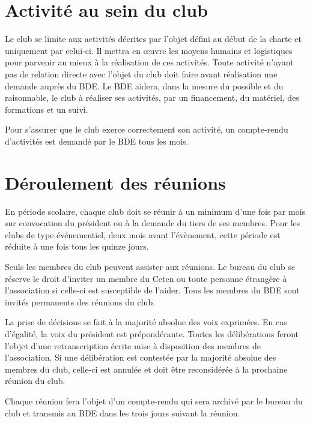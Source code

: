 \documentclass{article} %
\begin{document}
\begin{multicols}{2}
{		}

		\section{Activité au sein du club}
		
		{\small
		
			Le club se limite aux activités décrites par l’objet défini au début
			de la charte et uniquement par celui-ci. Il mettra en œuvre les
			moyens humains et logistiques pour parvenir au mieux à la
			réalisation de ces activités. Toute activité n’ayant pas de relation
			directe avec l’objet du club doit faire avant réalisation une
			demande auprès du BDE\@. Le BDE aidera, dans la mesure du possible et
			du raisonnable, le club à réaliser ses activités, par un 
			financement, du matériel, des formations et un suivi.

			Pour s’assurer que le club exerce correctement son activité, un
			compte-rendu d’activités est demandé par le BDE tous les mois.
			
		}

		\section{Déroulement des réunions}
		
		{\small
		
			En période scolaire, chaque club doit se réunir à un minimum d’une
			fois par mois sur convocation du président ou à la demande du tiers
			de ses membres. Pour les clubs de type événementiel, deux mois avant
			l’évènement, cette période est réduite à une fois tous les quinze
			jours.  

			Seuls les membres du club peuvent assister aux réunions. Le bureau
			du club se réserve le droit d’inviter un membre du Ceten ou toute
			personne étrangère à l’association si celle-ci est susceptible de
			l’aider. Tous les membres du BDE sont invités permanents des
			réunions du club.

			La prise de décisions se fait à la majorité absolue des voix
			exprimées. En cas d’égalité, la voix du président est prépondérante.
			Toutes les délibérations feront l’objet d’une retranscription écrite
			mise à disposition des membres de l’association. Si une délibération
			est contestée par la majorité absolue des membres du club, celle-ci
			est annulée et doit être reconsidérée à la prochaine réunion du
			club.

			Chaque réunion fera l’objet d’un compte-rendu qui sera archivé par
			le bureau du club et transmis au BDE dans les trois jours suivant la
			réunion.
			
}
\end{multicols}
\end{document}
